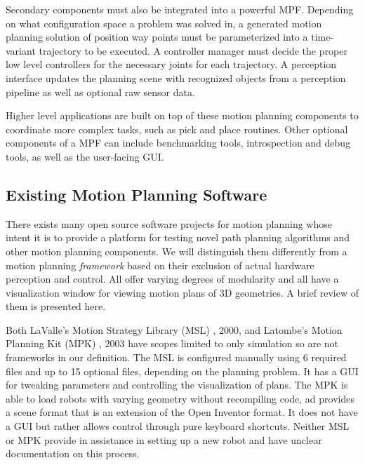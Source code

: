 \documentclass[10pt,journal,compsoc]{joser1}
\begin{document}
{Secondary components must also be integrated into a powerful MPF. Depending on what configuration space a problem was solved in, a generated motion planning solution of position way points must be parameterized into a time-variant trajectory to be executed. A controller manager must decide the proper low level controllers for the necessary joints for each trajectory. A perception interface updates the planning scene with recognized objects from a perception pipeline as well as optional raw sensor data.

Higher level applications are built on top of these motion planning components to coordinate more complex tasks, such as pick and place routines. Other optional components of a MPF can include benchmarking tools, introspection and debug tools, as well as the user-facing GUI.

\subsection{Existing Motion Planning Software}
\label{sec::existing}

There exists many open source software projects for motion planning whose intent it is to provide a platform for testing novel path planning algorithms and other motion planning components. We will distinguish them differently from a motion planning \textit{framework} based on their exclusion of actual hardware perception and control. All offer varying degrees of modularity and all have a visualization window for viewing motion plans of 3D geometries. A brief review of them is presented here.

Both LaValle's Motion Strategy Library (MSL) \cite{lavallemsl}, 2000, and Latombe's Motion Planning Kit (MPK) \cite{mpk}, 2003 have scopes limited to only simulation so are not frameworks in our definition. The MSL is configured manually using 6 required files and up to 15 optional files, depending on the planning problem. It has a GUI for tweaking parameters and controlling the visualization of plans. The MPK is able to load robots with varying geometry without recompiling code, ad provides a scene format that is an extension of the Open Inventor format. It does not have a GUI but rather allows control through pure keyboard shortcuts. Neither MSL or MPK provide in assistance in setting up a new robot and have unclear documentation on this process.

}
\end{document}
